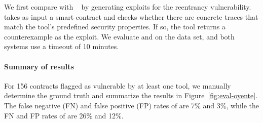 We first compare with \mythril~\cite{mythril} by generating exploits for the reentrancy vulnerability. \mythril takes as input 
a smart contract and checks whether there are concrete traces that match
the tool's predefined security properties. If so, the tool returns a counterexample
as the exploit. We evaluate \mythril and \toolname on the \etherscan data set, and 
both systems use a timeout of 10 minutes.


\paragraph{Summary of results}


For 156 contracts flagged as vulnerable
by at least one tool, we manually determine the ground truth and summarize the results in Figure~\ref{fig:eval-oyente}. 
The false negative (FN) and false positive (FP) rates of \toolname are 7\% and 3\%,
while the FN and FP rates of \mythril  are 26\% and 12\%.

